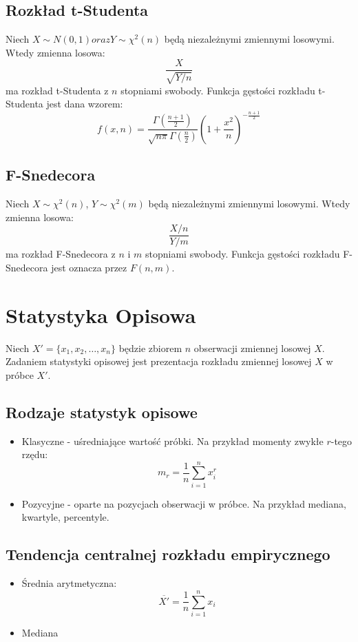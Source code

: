 \documentclass{../notatki}
\begin{document}
\subsection{Rozkład t-Studenta}

Niech $X \sim N(0, 1) oraz Y \sim \chi^2(n)$ będą niezależnymi
zmiennymi losowymi.
Wtedy zmienna losowa:
$$
\frac{X}{\sqrt{Y/n}}
$$
ma rozkład t-Studenta z $n$ stopniami swobody. Funkcja gęstości
rozkładu t-Studenta
jest dana wzorem:
$$
f(x, n) = \frac{\Gamma(\frac{n+1}{2})}{\sqrt{n\pi} \Gamma(\frac{n}{2})}
(1 + \frac{x^2}{n})^{-\frac{n+1}{2}}
$$

\subsection{F-Snedecora}

Niech $X \sim \chi^2(n)$, $Y \sim \chi^2(m)$ będą niezależnymi zmiennymi
losowymi. Wtedy zmienna losowa:
$$
\frac{X/n}{Y/m}
$$
ma rozkład F-Snedecora z $n$ i $m$ stopniami swobody. Funkcja gęstości
rozkładu F-Snedecora jest oznacza przez $F(n, m)$.

\section{Statystyka Opisowa}

Niech $X' = \{x_1, x_2, \ldots, x_n\}$ będzie zbiorem $n$ obserwacji zmiennej
losowej $X$. Zadaniem statystyki opisowej jest prezentacja rozkładu zmiennej
losowej $X$ w próbce $X'$.

\subsection{Rodzaje statystyk opisowe}

\begin{itemize}
  \item Klasyczne - uśredniające wartość próbki. Na przykład momenty
    zwykłe $r$-tego rzędu:
    $$
    m_r = \frac{1}{n} \sum_{i=1}^n x_i^r
    $$
  \item Pozycyjne - oparte na pozycjach obserwacji w próbce. Na przykład
    mediana, kwartyle, percentyle.
\end{itemize}

\subsection{Tendencja centralnej rozkładu empirycznego}

\begin{itemize}
  \item Średnia arytmetyczna:
    $$
    \overline{X'} = \frac{1}{n} \sum_{i=1}^n x_i
    $$
  \item Mediana
\end{itemize}
\end{document}
